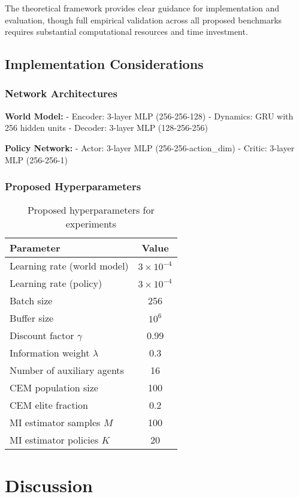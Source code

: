 \documentclass[12pt, a4paper]{article}
\begin{document}
The theoretical framework provides clear guidance for implementation and evaluation, though full empirical validation across all proposed benchmarks requires substantial computational resources and time investment.

\subsection{Implementation Considerations}

\subsubsection{Network Architectures}

\textbf{World Model:}
- Encoder: 3-layer MLP (256-256-128)
- Dynamics: GRU with 256 hidden units
- Decoder: 3-layer MLP (128-256-256)

\textbf{Policy Network:}
- Actor: 3-layer MLP (256-256-action\_dim)
- Critic: 3-layer MLP (256-256-1)

\subsubsection{Proposed Hyperparameters}

\begin{table}[h]
\centering
\caption{Proposed hyperparameters for experiments}
\begin{tabular}{lc}
\toprule
\textbf{Parameter} & \textbf{Value} \\
\midrule
Learning rate (world model) & $3 \times 10^{-4}$ \\
Learning rate (policy) & $3 \times 10^{-4}$ \\
Batch size & 256 \\
Buffer size & $10^6$ \\
Discount factor $\gamma$ & 0.99 \\
Information weight $\lambda$ & 0.3 \\
Number of auxiliary agents & 16 \\
CEM population size & 100 \\
CEM elite fraction & 0.2 \\
MI estimator samples $M$ & 100 \\
MI estimator policies $K$ & 20 \\
\bottomrule
\end{tabular}
\end{table}

\section{Discussion}
\end{document}
